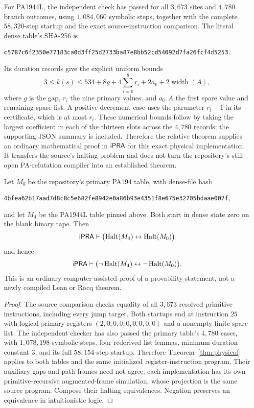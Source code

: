 For PA1944L, the independent check has passed for all $3,673$ sites and
$4,780$ branch outcomes, using $1,084,060$ symbolic steps, together with
the complete $58,320$-step startup and the exact source-instruction
comparison. The literal dense table's SHA-256 is
\begin{center}\small\texttt{c5787c6f2350e77183ca0d3ff25d2733ba87e8bb52cd54092d7fa26fcf4d5253}.\end{center}
Its duration records give the explicit uniform bounds
\[
 3\le k(s)\le
 534+8g+4\sum_{i=0}^{8}r_i+2a_0+2\operatorname{width}(A),
\]
where $g$ is the gap, $r_i$ the nine primary values, and $a_0,A$ the
first spare value and remaining spare list. A positive-decrement case
uses the parameter $r_i-1$ in its certificate, which is at most $r_i$.
These numerical bounds follow by taking the largest coefficient in each
of the thirteen slots across the $4,780$ records; the supporting JSON
summary is included. Therefore the relative theorem supplies an ordinary
mathematical proof in $\mathsf{iPRA}$ for this exact physical implementation.
It transfers the source's halting problem and does not turn the
repository's still-open PA-refutation compiler into an established theorem.

\begin{corollary}
Let $M_0$ be the repository's primary PA194 table, with dense-file hash
\begin{center}\small\texttt{4bfea62b17aad7d8c8c5e682fe8942e0a86b93e4351f8e675e32705bdaae007f},\end{center}
and let $M_4$ be the PA1944L table pinned above. Both start in dense state
zero on the blank binary tape. Then
\[
 \mathsf{iPRA}\vdash
 \bigl(\operatorname{Halt}(M_4)\leftrightarrow\operatorname{Halt}(M_0)\bigr)
\]
and hence
\[
 \mathsf{iPRA}\vdash
 \bigl(\neg\operatorname{Halt}(M_4)\leftrightarrow
       \neg\operatorname{Halt}(M_0)\bigr).
\]
This is an ordinary computer-assisted proof of a provability statement,
not a newly compiled Lean or Rocq theorem.
\end{corollary}
\begin{proof}
The source comparison checks equality of all $3,673$ resolved primitive
instructions, including every jump target. Both startups end at instruction
$25$ with logical primary registers $(2,0,0,0,0,0,0,0,0)$ and a nonempty
finite spare list. The independent checker has also passed the primary
table's $4,780$ cases, with $1,078,198$ symbolic steps, four rederived
list lemmas, minimum duration constant $3$, and its full $58,154$-step
startup. Therefore Theorem~\ref{thm:physical} applies to both tables and
the same initialized register-instruction program. Their auxiliary gaps
and path frames need not agree; each implementation has its own
primitive-recursive augmented-frame simulation, whose projection is the
same source program. Compose their halting equivalences. Negation
preserves an equivalence in intuitionistic logic.
\end{proof}

